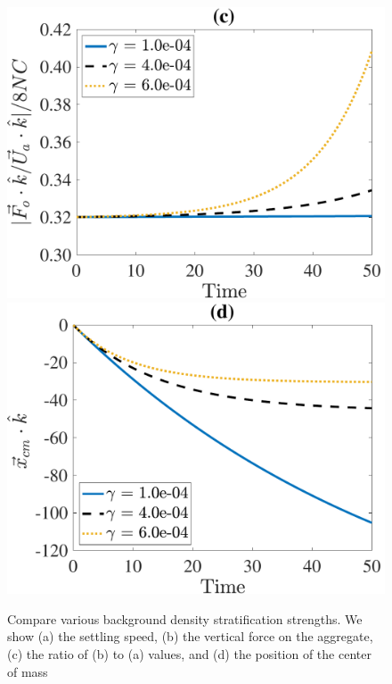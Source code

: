 \begin{figure}[ht]
\begin{center}
		\includegraphics[scale=0.35]{./figures/fig_NC50_g_Fo3Ua_ratio}
		\includegraphics[scale=0.35]{./figures/fig_NC50_g_cm3_all}
	\caption{Compare various background density stratification strengths. We show (a) the settling speed, (b) the vertical force on the aggregate, (c) the ratio of (b) to (a) values, and (d) the position of the center of mass }
	\label{fig_NC50_gg}
\end{center}
\end{figure}
